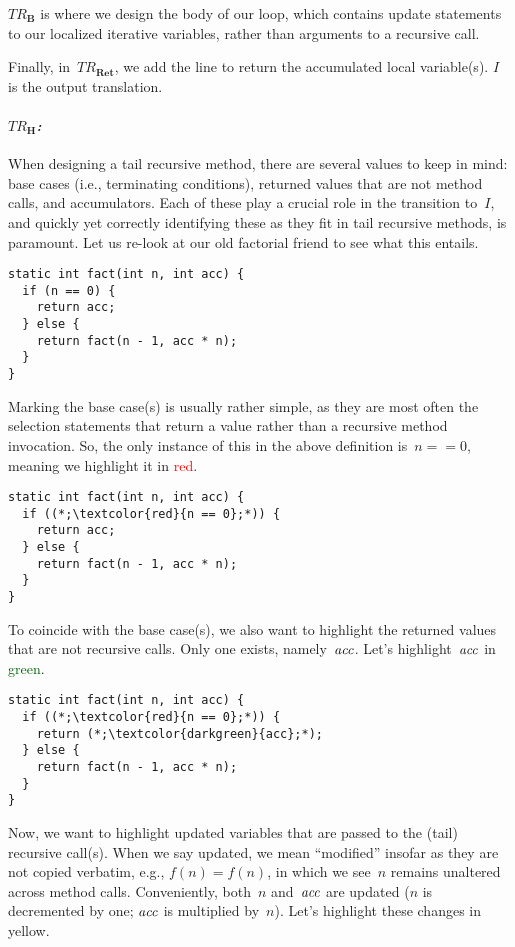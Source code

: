 \emph{$TR_\mathbf{B}$} is where we design the body of our loop, which contains update statements to our localized iterative variables, rather than arguments to a recursive call.

Finally, in~\emph{$TR_\mathbf{Ret}$}, we add the line to return the accumulated local variable(s). $I$ is the output translation.

\paragraph{\emph{$TR_\mathbf{H}$:}} When designing a tail recursive method, there are several values to keep in mind: base cases (i.e., terminating conditions), returned values that are not method calls, and accumulators. 
Each of these play a crucial role in the transition to~$I$, and quickly yet correctly identifying these as they fit in tail recursive methods, is paramount. 
Let us re-look at our old factorial friend to see what this entails.

\begin{lstlisting}[language=MyJava]
static int fact(int n, int acc) {
  if (n == 0) {
    return acc;
  } else {
    return fact(n - 1, acc * n);
  }
}
\end{lstlisting}

Marking the base case(s) is usually rather simple, as they are most often the selection statements that return a value rather than a recursive method invocation. 
So, the only instance of this in the above definition is~$n == 0$, meaning we highlight it in \textcolor{red}{red}.

\begin{lstlisting}[language=MyJava]
static int fact(int n, int acc) {
  if ((*;\textcolor{red}{n == 0};*)) {
    return acc;
  } else {
    return fact(n - 1, acc * n);
  }
}
\end{lstlisting}

To coincide with the base case(s), we also want to highlight the returned values that are not recursive calls. 
Only one exists, namely~$\emph{acc}$. 
Let's highlight~$\emph{acc}$ in \textcolor{darkgreen}{green}.

\begin{lstlisting}[language=MyJava]
static int fact(int n, int acc) {
  if ((*;\textcolor{red}{n == 0};*)) {
    return (*;\textcolor{darkgreen}{acc};*);
  } else {
    return fact(n - 1, acc * n);
  }
}
\end{lstlisting}

Now, we want to highlight updated variables that are passed to the (tail) recursive call(s). 
When we say updated, we mean ``modified'' insofar as they are not copied verbatim, e.g., $f(n) = f(n)$, in which we see~$n$ remains unaltered across method calls. 
Conveniently, both~$n$ and~$\emph{acc}$ are updated ($n$ is decremented by one; $\emph{acc}$ is multiplied by~$n$). 
Let's highlight these changes in \textcolor{darkyellow}{yellow}. 

